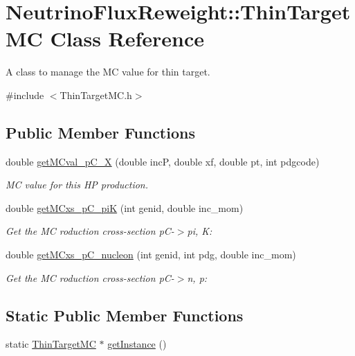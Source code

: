 \hypertarget{class_neutrino_flux_reweight_1_1_thin_target_m_c}{\section{Neutrino\-Flux\-Reweight\-:\-:Thin\-Target\-M\-C Class Reference}
\label{class_neutrino_flux_reweight_1_1_thin_target_m_c}
}


A class to manage the M\-C value for thin target.  




{\ttfamily \#include $<$Thin\-Target\-M\-C.\-h$>$}

\subsection*{Public Member Functions}
\begin{DoxyCompactItemize}
\item 
double \hyperlink{class_neutrino_flux_reweight_1_1_thin_target_m_c_ab5b49f9b0e1f868f9b609f73a7883519}{get\-M\-Cval\-\_\-p\-C\-\_\-\-X} (double inc\-P, double xf, double pt, int pdgcode)
\begin{DoxyCompactList}\small\item\em M\-C value for this H\-P production. \end{DoxyCompactList}\item 
double \hyperlink{class_neutrino_flux_reweight_1_1_thin_target_m_c_ae807633e56881fb05646a4fe35814f44}{get\-M\-Cxs\-\_\-p\-C\-\_\-pi\-K} (int genid, double inc\-\_\-mom)
\begin{DoxyCompactList}\small\item\em Get the M\-C roduction cross-\/section p\-C-\/$>$pi, K\-: \end{DoxyCompactList}\item 
double \hyperlink{class_neutrino_flux_reweight_1_1_thin_target_m_c_ad9e29a478031808bc82f2bc493e6de57}{get\-M\-Cxs\-\_\-p\-C\-\_\-nucleon} (int genid, int pdg, double inc\-\_\-mom)
\begin{DoxyCompactList}\small\item\em Get the M\-C roduction cross-\/section p\-C-\/$>$n, p\-: \end{DoxyCompactList}\end{DoxyCompactItemize}
\subsection*{Static Public Member Functions}
\begin{DoxyCompactItemize}
\item 
static \hyperlink{class_neutrino_flux_reweight_1_1_thin_target_m_c}{Thin\-Target\-M\-C} $\ast$ \hyperlink{class_neutrino_flux_reweight_1_1_thin_target_m_c_a2a114747fed2677cd3b7213555c002b9}{get\-Instance} ()
\end{DoxyCompactItemize}
